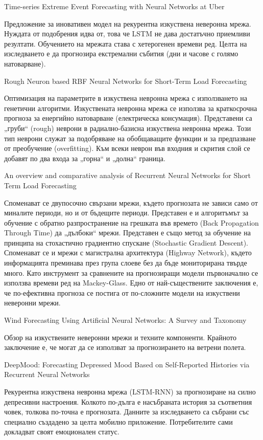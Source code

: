 ﻿Time-series Extreme Event Forecasting with Neural Networks at Uber

Предложение за иновативен модел на рекурентна изкуствена неверонна мрежа. Нуждата от подобрения идва от, това че LSTM не дава достатъчно приемливи резултати. Обучението на мрежата става с хетерогенен времеви ред. Целта на изследването е да прогнозира екстремални събития (дни и часове с голямо натоварване). 

Rough Neuron based RBF Neural Networks for Short-Term Load Forecasting

Оптимизация на параметрите в изкуствена невронна мрежа с използването на генетични алгоритми. Изкуствената невронна мрежа се използва за краткосрочна прогноза за енергийно натоварване (електрическа консумация). Представени са „груби“ (rough) неврони в радиално-базисна изкуствена невронна мрежа. Този тип неврони служат за подобряване на обобщаващите функции и за предпазване от преобучение (overfitting). Към всеки неврон във входния и скрития слой се добавят по два входа за „горна“ и „долна“ граница. 

An overview and comparative analysis of Recurrent Neural Networks for Short Term Load Forecasting

Споменават се двупосочно свързани мрежи, където прогнозата не зависи само от миналите периоди, но и от бъдещите периоди. Представен е и алгоритъмът за обучение с обратно разпространение на грешката във времето (Back Propagation Through Time) да „дълбоки“ мрежи. Представен е също метод за обучение на принципа на стохастично градиентно спускане (Stochastic Gradient Descent). Споменават се и мрежи с магистрална архитектура (Highway Network), където информацията преминава през група слоеве без да бъде мониторирана твърде много. Като инструмент за сравнените на прогнозиращи модели първоначално се използва времеви ред на Mackey-Glass. Едно от най-съществените заключения е, че по-ефективна прогноза се постига от по-сложните модели на изкуствени неверонни мрежи. 

Wind Forecasting Using Artificial Neural Networks: A
Survey and Taxonomy

Обзор на изкуствените неверонни мрежи и техните компоненти. Крайното заключение е, че могат да се използват за прогнозирането на ветрени полета. 

DeepMood: Forecasting Depressed Mood Based on Self-Reported Histories via Recurrent Neural Networks

Рекурентна изкуствена невронна мрежа (LSTM-RNN) за прогнозиране на силно депресивни настроения. Колкото по-дълга е насъбраната история за съответния човек, толкова по-точна е прогнозата. Данните за изследването са събрани със специално създадено за целта мобилно приложение. Потребителите сами докладват своят емоционален статус. 


